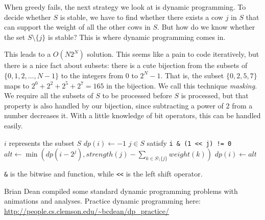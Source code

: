 When greedy fails, the next strategy we look at is dynamic programming. To decide whether $S$ is stable, we have to find whether there exists a cow $j$ in $S$ that can support the weight of all the other cows in $S$. But how do we know whether the set $S \setminus \{j\}$ is stable? This is where dynamic programming comes in.

This leads to a $O(N 2^N)$ solution. This seems like a pain to code iteratively, but there is a nice fact about subsets: there is a cute bijection from the subsets of $\{0,1,2, \ldots, N-1\}$ to the integers from 0 to $2^N - 1$. That is, the subset $\{0,2,5,7\}$ maps to $2^0 + 2^2 + 2^5 + 2^7 = 165$ in the bijection. We call this technique \textit{masking}. We require all the subsets of $S$ to be processed before $S$ is processed, but that property is also handled by our bijection, since subtracting a power of 2 from a number decreases it. With a little knowledge of bit operators, this can be handled easily.

\noindent \begin{minipage}{\textwidth}
\begin{algorithmic}
	\Comment $i$ represents the subset $S$
	\State $dp(i) \gets -1$
		\Comment $j \in S$ satisfy \texttt{i \& (1 << j) != 0}
		\State $alt \gets \min(dp(i-2^j), strength(j) - \sum_{k \in S \setminus \{j\}} weight(k))$
			\State $dp(i) \gets alt$
		\EndIf
	\EndFor
\EndFor
\end{algorithmic}
\end{minipage}

\texttt{\&} is the bitwise and function, while \texttt{<<} is the left shift operator.

Brian Dean compiled some standard dynamic programming problems with animations and analyses. Practice dynamic programming here: \url{http://people.cs.clemson.edu/~bcdean/dp_practice/}

